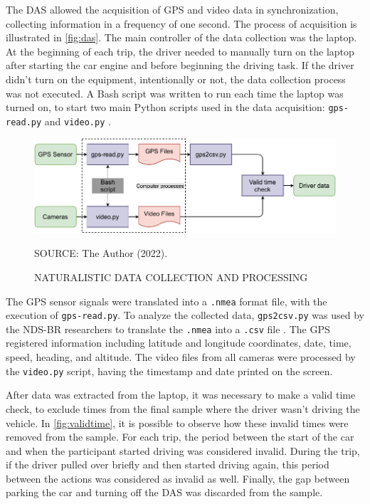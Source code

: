 
The DAS allowed the acquisition of GPS and video data in synchronization, collecting information in a frequency of one second. The process of acquisition is illustrated in \autoref{fig:das}. The main controller of the data collection was the laptop. At the beginning of each trip, the driver needed to manually turn on the laptop after starting the car engine and before beginning the driving task. If the driver didn't turn on the equipment, intentionally or not, the data collection process was not executed. A Bash script was written to run each time the laptop was turned on, to start two main Python scripts used in the data acquisition: \verb|gps-read.py| and \verb|video.py| \cite{Borguezani2020}.  

\begin{figure}[!htbp]
    \centering\footnotesize
    \captionsetup{font=footnotesize}
    \caption{NATURALISTIC DATA COLLECTION AND PROCESSING}
    \includegraphics{fig/DAS.pdf}
    \label{fig:das}
    \par SOURCE: The Author (2022).
\end{figure}

The GPS sensor signals were translated into a \verb|.nmea| format file, with the execution of \verb|gps-read.py|. To analyze the collected data, \verb|gps2csv.py| was used by the NDS-BR researchers to translate the \verb|.nmea| into a \verb|.csv| file \cite{Pereira2020}. The GPS registered information including latitude and longitude coordinates, date, time, speed, heading, and altitude. The video files from all cameras were processed by the \verb|video.py| script, having the timestamp and date printed on the screen.

After data was extracted from the laptop, it was necessary to make a valid time check, to exclude times from the final sample where the driver wasn't driving the vehicle. In \autoref{fig:validtime}, it is possible to observe how these invalid times were removed from the sample. For each trip, the period between the start of the car and when the participant started driving was considered invalid. During the trip, if the driver pulled over briefly and then started driving again, this period between the actions was considered as invalid as well. Finally, the gap between parking the car and turning off the DAS was discarded from the sample.  

